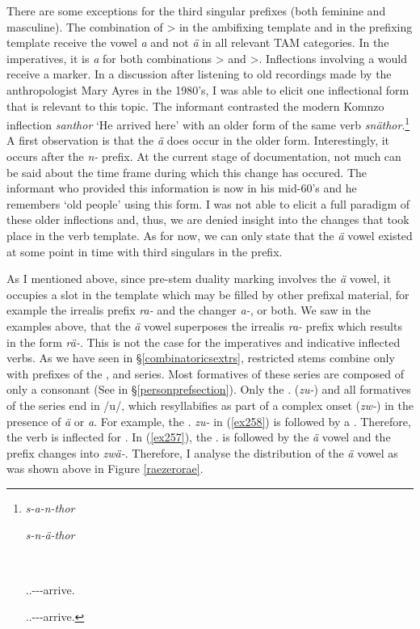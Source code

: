 There are some exceptions for the third singular prefixes (both feminine and masculine). The combination of \Sg>\Tsg{} in the ambifixing template and \Tsg{} in the prefixing template receive the vowel \emph{a} and not \emph{ä} in all relevant TAM categories. In the imperatives, it is \emph{a} for both combinations \Sg>\Tsg{} and \Pl>\Tsg{}. Inflections involving a   would receive a  marker. In a discussion after listening to old recordings made by the anthropologist Mary Ayres in the 1980's, I was able to elicit one inflectional form that is relevant to this topic. The informant contrasted the modern Komnzo inflection \emph{santhor} `He arrived here' with an older form of the same verb \emph{snäthor}.\footnote{\parbox{0.02cm}{\hfill}\parbox{6cm}{\emph{s-a-n-thor}} \parbox{5cm}{\emph{s-n-ä-thor}}\\ \parbox{0.1cm}{\hfill}\parbox{6cm}{\Tsg.\Masc.\Gam-\Ndu-\Venit-arrive.\Rs{}}  \parbox{15cm}{\Tsg.\Masc.\Gam-\Venit-\Ndu-arrive.\Rs}} A first observation is that the \emph{ä} does occur in the older form. Interestingly, it occurs after the  \emph{n-} prefix. At the current stage of documentation, not much can be said about the time frame during which this change has occured. The informant who provided this information is now in his mid-60's and he remembers `old people' using this form. I was not able to elicit a full paradigm of these older inflections and, thus, we are denied insight into the changes that took place in the verb template. As for now, we can only state that the  \emph{ä} vowel existed at some point in time with third singulars in the prefix.%

As I mentioned above, since pre-stem duality marking involves the \emph{ä} vowel, it occupies a slot in the template which may be filled by other prefixal material, for example the irrealis prefix \emph{ra-} and the  changer \emph{a-}, or both. We saw in the examples above, that the  \emph{ä} vowel superposes the irrealis \emph{ra-} prefix which results in the form \emph{rä-}. This is not the case for the imperatives and indicative inflected verbs. As we have seen in \S{}\ref{combinatoricsextrs}, restricted stems combine only with prefixes of the \Bet{}, \Betatwo{} and \Gam{} series. Most formatives of these series are composed of only a consonant (See  in \S{}\ref{personprefsection}). Only the \Fsg.\Gam{} (\emph{zu-}) and all formatives of the \Betatwo{} series end in /u/, which resyllabifies as part of a complex onset (\emph{zw-}) in the presence of \emph{ä} or \emph{a}. For example, the \Fsg.\Gam{} \emph{zu-} in (\ref{ex258}) is followed by a . Therefore, the verb is inflected for . In (\ref{ex257}), the \Fsg.\Gam{} is followed by the  \emph{ä} vowel and the prefix changes into \emph{zwä-}. Therefore, I analyse the distribution of the \emph{ä} vowel as was shown above in Figure \ref{raezerorae}.

